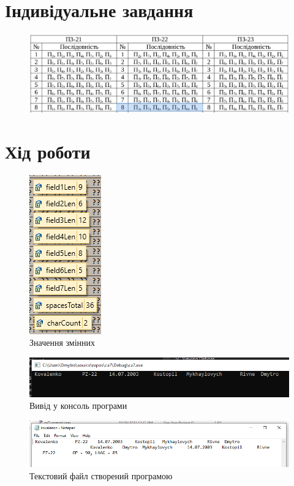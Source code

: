 \documentclass{article}
\begin{document}
\begin{normalsize}
	\section*{Індивідуальне завдання}
	\begin{figure}[H]
		\centering
		\includegraphics[scale=0.45]{v}
	\end{figure}
	
	\section*{Хід роботи}
	
	\begin{figure}[H]
		\centering
		\includegraphics[scale=0.8]{1}
		\caption{Значення змінних}
	\end{figure}
	
	\begin{figure}[H]
		\centering
		\includegraphics[scale=0.6]{2}
		\caption{Вивід у консоль програми}
	\end{figure}

	\begin{figure}[H]
		\centering
		\includegraphics[scale=0.5]{3}
		\caption{Текстовий файл створений програмою}
	\end{figure}
	

\end{normalsize}
\end{document}
